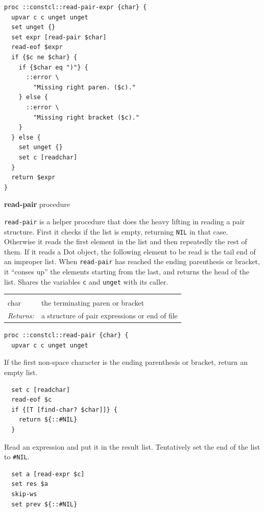 \documentclass[a5paper,draft]{memoir}
\begin{document}
\begin{lstlisting}
proc ::constcl::read-pair-expr {char} {
  upvar c c unget unget
  set unget {}
  set expr [read-pair $char]
  read-eof $expr
  if {$c ne $char} {
    if {$char eq ")"} {
      ::error \
        "Missing right paren. ($c)."
    } else {
      ::error \
        "Missing right bracket ($c)."
    }
  } else {
    set unget {}
    set c [readchar]
  }
  return $expr
}
\end{lstlisting}

\textbf{read-pair} procedure

\texttt{read-pair} is a helper procedure that does the heavy lifting in reading a pair structure. First it checks if the list is empty, returning \texttt{NIL} in that case. Otherwise it reads the first element in the list and then repeatedly the rest of them. If it reads a Dot object, the following element to be read is the tail end of an improper list. When \texttt{read-pair} has reached the ending parenthesis or bracket, it ``conses up'' the elements starting from the last, and returns the head of the list. Shares the variables \texttt{c} and \texttt{unget} with its caller.

\noindent\begin{tabular}{ |p{1.9cm} p{6.5cm}| }
\hline
\rowcolor[HTML]{CCCCCC} \multicolumn{2}{|l|}{\textbf{read-pair (internal)}} \\
char & the terminating paren or bracket \\
\textit{Returns:} & a structure of pair expressions or end of file \\
\hline
\end{tabular}

\begin{lstlisting}
proc ::constcl::read-pair {char} {
  upvar c c unget unget
\end{lstlisting}

If the first non-space character is the ending parenthesis or bracket, return an empty list.

\begin{lstlisting}
  set c [readchar]
  read-eof $c
  if {[T [find-char? $char]]} {
    return ${::#NIL}
  }
\end{lstlisting}

Read an expression and put it in the result list. Tentatively set the end of the list to \texttt{\#NIL}.

\begin{lstlisting}
  set a [read-expr $c]
  set res $a
  skip-ws
  set prev ${::#NIL}
\end{lstlisting}
\end{document}
